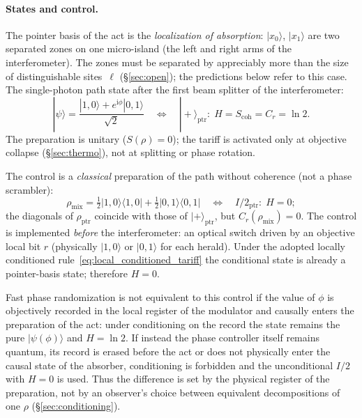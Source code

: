 \documentclass[11pt,a4paper]{article}
\newcommand{\Sref}[1]{\hyperref[#1]{\S\ref{#1}}}
\begin{document}
\paragraph{States and control.}
The pointer basis of the act is the \emph{localization of absorption}: $|x_0\rangle$, $|x_1\rangle$ are two separated zones on one micro-island (the left and right arms of the interferometer). The zones must be separated by appreciably more than the size of distinguishable sites~$\ell$ (\Sref{sec:open}); the predictions below refer to this case. The single-photon path state after the first beam splitter of the interferometer:
\begin{equation}
|\psi\rangle = \frac{|1,0\rangle + e^{\mathrm{i}\phi}|0,1\rangle}{\sqrt{2}}
\quad\Leftrightarrow\quad
|{+}\rangle_{\mathrm{ptr}}:\;
H = S_{\mathrm{coh}} = C_r = \ln 2.
\end{equation}
The preparation is unitary ($S(\rho)=0$); the tariff is activated only at objective collapse (\Sref{sec:thermo}), not at splitting or phase rotation.

The control is a \emph{classical} preparation of the path without coherence (not a phase scrambler):
\begin{equation}
\rho_{\mathrm{mix}} = \tfrac{1}{2}|1,0\rangle\langle 1,0| + \tfrac{1}{2}|0,1\rangle\langle 0,1|
\quad\Leftrightarrow\quad
I/2_{\mathrm{ptr}}:\;
H = 0;
\end{equation}
the diagonals of $\rho_{\mathrm{ptr}}$ coincide with those of $|{+}\rangle_{\mathrm{ptr}}$, but $C_r(\rho_{\mathrm{mix}})=0$. The control is implemented \emph{before} the interferometer: an optical switch driven by an objective local bit $r$ (physically $|1,0\rangle$ or $|0,1\rangle$ for each herald). Under the adopted locally conditioned rule~\eqref{eq:local_conditioned_tariff} the conditional state is already a pointer-basis state; therefore $H=0$.

Fast phase randomization is not equivalent to this control if the value of $\phi$ is objectively recorded in the local register of the modulator and causally enters the preparation of the act: under conditioning on the record the state remains the pure $|\psi(\phi)\rangle$ and $H=\ln2$. If instead the phase controller itself remains quantum, its record is erased before the act or does not physically enter the causal state of the absorber, conditioning is forbidden and the unconditional $I/2$ with $H=0$ is used. Thus the difference is set by the physical register of the preparation, not by an observer's choice between equivalent decompositions of one $\rho$ (\Sref{sec:conditioning}).
\end{document}
